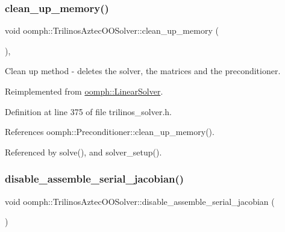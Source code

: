 \subsubsection{\texorpdfstring{clean\+\_\+up\+\_\+memory()}{clean\_up\_memory()}}
{\footnotesize\ttfamily void oomph\+::\+Trilinos\+Aztec\+O\+O\+Solver\+::clean\+\_\+up\+\_\+memory (\begin{DoxyParamCaption}{ }\end{DoxyParamCaption})\hspace{0.3cm}{\ttfamily [inline]}, {\ttfamily [virtual]}}



Clean up method -\/ deletes the solver, the matrices and the preconditioner. 



Reimplemented from \hyperlink{classoomph_1_1LinearSolver_a9d66f3262e80ca06a365f98216afd85f}{oomph\+::\+Linear\+Solver}.



Definition at line 375 of file trilinos\+\_\+solver.\+h.



References oomph\+::\+Preconditioner\+::clean\+\_\+up\+\_\+memory().



Referenced by solve(), and solver\+\_\+setup().

\mbox{\label{classoomph_1_1TrilinosAztecOOSolver_a9f79dc6d711d4052ee61cb305da226db}} 
\subsubsection{\texorpdfstring{disable\+\_\+assemble\+\_\+serial\+\_\+jacobian()}{disable\_assemble\_serial\_jacobian()}}
{\footnotesize\ttfamily void oomph\+::\+Trilinos\+Aztec\+O\+O\+Solver\+::disable\+\_\+assemble\+\_\+serial\+\_\+jacobian (\begin{DoxyParamCaption}{ }\end{DoxyParamCaption})\hspace{0.3cm}{\ttfamily [inline]}}



